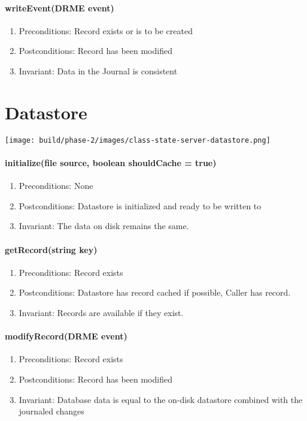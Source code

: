 \documentclass[a4paper]{report}
\begin{document}
		

	\paragraph{writeEvent(DRME event)}
		\begin{enumerate}
			\item Preconditions: Record exists or is to be created
			\item Postconditions: Record has been modified
			\item Invariant: Data in the Journal is consistent
		\end{enumerate}

	\pagebreak

\section{Datastore}

	\begin{center}
		\texttt{[image: build/phase-2/images/class-state-server-datastore.png]}
	\end{center}

	\paragraph{initialize(file source, boolean shouldCache = true)}
		\begin{enumerate}
			\item Preconditions: None
			\item Postconditions: Datastore is initialized and ready to be written to
			\item Invariant: The data on disk remains the same.
		\end{enumerate}

	\paragraph{getRecord(string key)}
		\begin{enumerate}
			\item Preconditions: Record exists
			\item Postconditions: Datastore has record cached if possible, Caller has record.
			\item Invariant: Records are available if they exist.
		\end{enumerate}

	\paragraph{modifyRecord(DRME event)}
		\begin{enumerate}
			\item Preconditions: Record exists
			\item Postconditions: Record has been modified
			\item Invariant: Database data is equal to the on-disk datastore combined with the journaled changes
		\end{enumerate}
\end{document}
